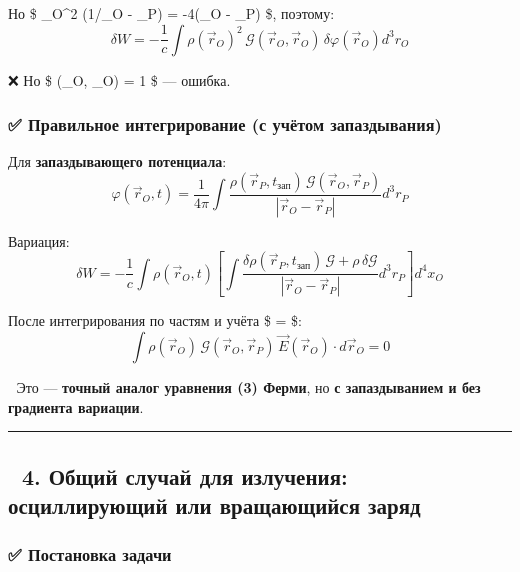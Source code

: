 \documentclass[11pt]{article}
\begin{document}
Но \$ \nabla\_O\^{}2 (1/\textbar{}\_O - \_P\textbar{}) =
-4\pi \delta(\_O - \_P) \$, поэтому: \[
\delta W = -\frac{1}{c} \int \rho(\vec{r}_O)^2 \, \mathcal{G}(\vec{r}_O, \vec{r}_O) \, \delta \varphi(\vec{r}_O) d^3r_O
\]

❌ Но \$ (\_O, \_O) = 1 \$ --- ошибка.

\subsubsection{✅ Правильное интегрирование (с учётом
запаздывания)}\label{ux43fux440ux430ux432ux438ux43bux44cux43dux43eux435-ux438ux43dux442ux435ux433ux440ux438ux440ux43eux432ux430ux43dux438ux435-ux441-ux443ux447ux451ux442ux43eux43c-ux437ux430ux43fux430ux437ux434ux44bux432ux430ux43dux438ux44f}

Для \textbf{запаздывающего потенциала}: \[
\varphi(\vec{r}_O, t) = \frac{1}{4\pi} \int \frac{\rho(\vec{r}_P, t_{\text{зап}}) \, \mathcal{G}(\vec{r}_O, \vec{r}_P)}{|\vec{r}_O - \vec{r}_P|} d^3r_P
\]

Вариация: \[
\delta W = -\frac{1}{c} \int \rho(\vec{r}_O, t) \left[ \int \frac{\delta \rho(\vec{r}_P, t_{\text{зап}}) \, \mathcal{G} + \rho \, \delta \mathcal{G}}{|\vec{r}_O - \vec{r}_P|} d^3r_P \right] d^4x_O
\]

После интегрирования по частям и учёта \$ \delta {} =
 \$: \[
\boxed{
\int \rho(\vec{r}_O) \, \mathcal{G}(\vec{r}_O, \vec{r}_P) \, \vec{E}(\vec{r}_O) \cdot d\vec{r}_O = 0
}
\]

📌 Это --- \textbf{точный аналог уравнения (3) Ферми}, но \textbf{с
запаздыванием и без градиента вариации}.

\begin{center}\rule{0.5\linewidth}{\linethickness}\end{center}

\subsection{🔹 4. Общий случай для излучения: осциллирующий или
вращающийся
заряд}\label{ux43eux431ux449ux438ux439-ux441ux43bux443ux447ux430ux439-ux434ux43bux44f-ux438ux437ux43bux443ux447ux435ux43dux438ux44f-ux43eux441ux446ux438ux43bux43bux438ux440ux443ux44eux449ux438ux439-ux438ux43bux438-ux432ux440ux430ux449ux430ux44eux449ux438ux439ux441ux44f-ux437ux430ux440ux44fux434}

\subsubsection{✅ Постановка
задачи}\label{ux43fux43eux441ux442ux430ux43dux43eux432ux43aux430-ux437ux430ux434ux430ux447ux438-2}
\end{document}
